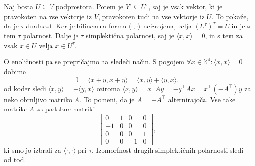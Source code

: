 \documentclass[fin1, tisk]{fmfdelo}
\begin{document}
\begin{dokaz}
   Naj bosta $U\subseteq V$ podprostora. 
   Potem je $V^\tau \subseteq U^\tau$, saj je vsak vektor, ki je pravokoten na vse vektorje iz $V$, 
   pravokoten tudi na vse vektorje iz $U$. To pokaže, da je $\tau$ dualnost.
   Ker je bilinearna forma $\langle \cdot, \cdot\rangle$ neizrojena, velja $(U^\tau)^\tau = U$ in je s tem $\tau$ polarnost.
   Dalje je $\tau$ simplektična polarnost, saj je $\langle x, x\rangle = 0$, in s tem za vsak $x\in U$ velja $x\in U^\tau$.

   O enoličnosti pa se prepričajmo na sledeči način.
   S pogojem $\forall x\in\mathbb{K}^4: \langle x, x\rangle = 0$ dobimo 
   $$0 = \langle x + y, x + y\rangle = \langle x, y\rangle + \langle y, x\rangle,$$ 
   od koder sledi
   $\langle x, y\rangle = -\langle y, x\rangle$ oziroma $\langle x, y\rangle = x^\top A y = -y^\top A x = x^\top(-A^\top)y$ za neko obrnljivo matriko $A$.
   To pomeni, da je $A = -A^\top$ alternirajoča. Vse take matrike $A$ so podobne matriki 
   \[\begin{bmatrix}
        0 & 1 & 0 & 0\\
        -1 & 0 & 0 & 0\\
        0 & 0 & 0 & 1\\
        0 & 0 & -1 & 0
   \end{bmatrix},\]
   ki smo jo izbrali za $\langle\cdot,\cdot\rangle$ pri $\tau$. Izomorfnost drugih simplektičnih polarnosti sledi od tod.
\end{dokaz}
\end{document}
